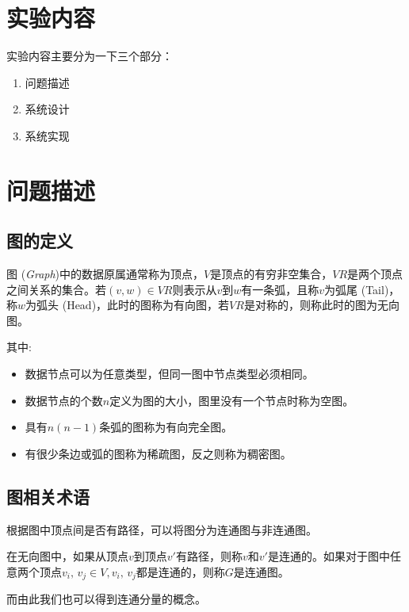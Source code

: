 
\section{实验内容}\label{sec:test42}
    实验内容主要分为一下三个部分：
\begin{enumerate}
    \item 问题描述
    \item 系统设计
    \item 系统实现
\end{enumerate}
\section{问题描述}
\subsection{图的定义}
\begin{definition}\label{def:binarytree5}
    图 (\emph{Graph})中的数据原属通常称为顶点，$V$是顶点的有穷非空集合，$VR$是两个顶点之间关系的集合。若$(v,w)\in
    VR$则表示从$v$到$w$有一条弧，且称$v$为弧尾 (Tail)，称$w$为弧头 (Head)，此时的图称为有向图，若$VR$是对称的，则称此时的图为无向图。
\end{definition}
其中:
\begin{itemize}
    \item 数据节点可以为任意类型，但同一图中节点类型必须相同。
    \item 数据节点的个数$n$定义为图的大小，图里没有一个节点时称为空图。
    \item 具有$n(n-1)$条弧的图称为有向完全图。
    \item 有很少条边或弧的图称为稀疏图，反之则称为稠密图。
\end{itemize}

\subsection{图相关术语}

根据图中顶点间是否有路径，可以将图分为连通图与非连通图。

\begin{definition}
    在无向图中，如果从顶点$v$到顶点$v'$有路径，则称$v$和$v'$是连通的。如果对于图中任意两个顶点$v_i,\,v_j\in V,v_i,\,v_j$都是连通的，则称$G$是连通图。
\end{definition}

而由此我们也可以得到连通分量的概念。

